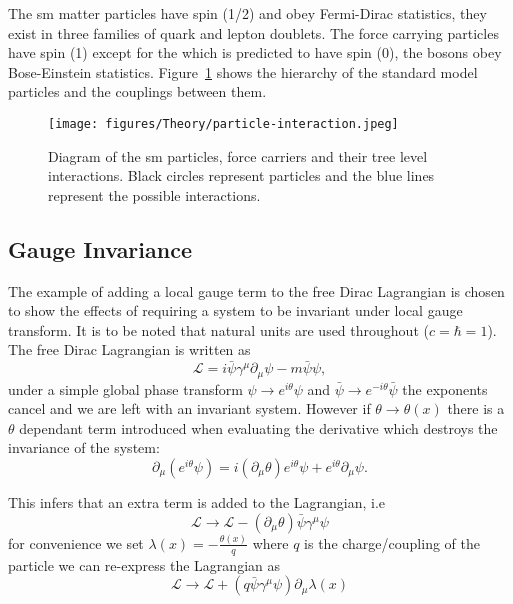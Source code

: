 The \ac{sm} matter particles have spin (1/2) and obey Fermi-Dirac statistics, 
they exist in three families of quark and lepton doublets. The force carrying 
particles have spin (1) except for the \PHiggs which is predicted to have spin 
(0), the bosons obey Bose-Einstein statistics. 
Figure~\ref{fig:figures_Theory_particle-interaction} shows the hierarchy of the 
standard model particles and the couplings between them.

\begin{figure}[htbp]
  \centering
    \texttt{[image: figures/Theory/particle-interaction.jpeg]}
  \caption{Diagram of the \ac{sm} particles, force carriers and their tree 
  level interactions. Black circles represent particles and the blue lines 
  represent the possible interactions.\cite{wikiParticleInteractions}}
  \label{fig:figures_Theory_particle-interaction}
\end{figure}

\subsection{Gauge Invariance} %
\label{sub:gauge_invariance}
The example of adding a local gauge term to the free Dirac Lagrangian is chosen 
to show the effects of requiring a system to be invariant under local gauge 
transform. It is to be noted that natural units are used throughout ($c = \hbar 
= 1$). The free Dirac Lagrangian is written as
\begin{equation}
  \mathcal{L} = i\bar{\psi}\gamma^{\mu}\partial_{\mu}\psi - m\bar{\psi}\psi,
  \label{eq:freeDiracL}
\end{equation}
under a simple global phase transform $\psi\rightarrow e^{i\theta}\psi$ and 
$\bar{\psi}\rightarrow e^{-i\theta}\bar{\psi}$ the exponents cancel and we are 
left with an invariant system. However if $\theta\rightarrow\theta (x)$ there 
is a $\theta$ dependant term introduced when evaluating the derivative which 
destroys the invariance of the system:
\begin{equation}
  \partial_{\mu}\left(e^{i\theta}\psi\right) = i\left(\partial_{\mu}\theta\right)e^{i\theta}\psi + e^{i\theta}\partial_{\mu}\psi.
\end{equation} 

This infers that an extra term is added to the Lagrangian, i.e
\begin{equation}
  \mathcal{L}\rightarrow\mathcal{L}-\left(\partial_{\mu}\theta\right)\bar{\psi}\gamma^{\mu}\psi
\end{equation}
for convenience we set $\lambda(x) = -\frac{\theta(x)}{q}$ where $q$ is the 
charge/coupling of the particle we can re-express the Lagrangian as
\begin{equation}  \mathcal{L} \rightarrow \mathcal{L} + \left( q\bar{\psi}\gamma^{\mu} \psi \right) \partial_{\mu} \lambda(x)
  \label{eq:diracLplusLambda}
\end{equation}

